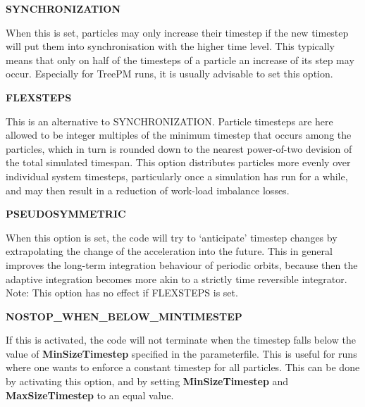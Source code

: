 \begin{DoxyItemize}
\item {\bfseries SYNCHRONIZATION} \par
 When this is set, particles may only increase their timestep if the new timestep will put them into synchronisation with the higher time level. This typically means that only on half of the timesteps of a particle an increase of its step may occur. Especially for TreePM runs, it is usually advisable to set this option.
\end{DoxyItemize}


\begin{DoxyItemize}
\item {\bfseries FLEXSTEPS} \par
 This is an alternative to SYNCHRONIZATION. Particle timesteps are here allowed to be integer multiples of the minimum timestep that occurs among the particles, which in turn is rounded down to the nearest power-\/of-\/two devision of the total simulated timespan. This option distributes particles more evenly over individual system timesteps, particularly once a simulation has run for a while, and may then result in a reduction of work-\/load imbalance losses.
\end{DoxyItemize}


\begin{DoxyItemize}
\item {\bfseries PSEUDOSYMMETRIC} \par
 When this option is set, the code will try to `anticipate' timestep changes by extrapolating the change of the acceleration into the future. This in general improves the long-\/term integration behaviour of periodic orbits, because then the adaptive integration becomes more akin to a strictly time reversible integrator. Note: This option has no effect if FLEXSTEPS is set.
\end{DoxyItemize}


\begin{DoxyItemize}
\item {\bfseries NOSTOP\_\-WHEN\_\-BELOW\_\-MINTIMESTEP} \par
 If this is activated, the code will not terminate when the timestep falls below the value of {\bfseries MinSizeTimestep} specified in the parameterfile. This is useful for runs where one wants to enforce a constant timestep for all particles. This can be done by activating this option, and by setting {\bfseries MinSizeTimestep} and {\bfseries MaxSizeTimestep} to an equal value.
\end{DoxyItemize}


